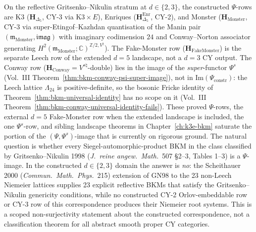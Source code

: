 On the reflective Gritsenko--Nikulin stratum at \(d\in\{2,3\}\), the
constructed \(\Psi\)-rows are K3
($\mathbf{H}_{\Delta_5}$, CY-3 via $\mathrm{K3} \times E$), Enriques
($\mathbf{H}_{\Delta_5}^{\mathrm{Enr}}$, CY-2), and Monster
($\mathbf{H}_{\mathrm{Monster}}$, CY-3 via super-Etingof--Kazhdan
quantisation of the Manin pair
$(\mathfrak m_{\mathrm{Monster}}, \mathfrak{imag})$ with imaginary
codimension $24$ and Conway--Norton associator generating
$H^2(\mathfrak m_{\mathrm{Monster}}; \mathbb C)^{\mathbb Z/2, V^\natural}$).
The Fake-Monster row
($\mathbf{H}_{\mathrm{FakeMonster}}$) is the separate Leech row of the
extended \(d=5\) landscape, not a \(d=3\) CY output. The Conway
row ($\mathbf{H}_{\mathrm{Conway}} = V^{s\natural}$-double) lies in
the image of the \emph{super}-functor $\Psi^{s}$
(Vol.~III Theorem~\ref{thm:bkm-conway-psi-super-image}), not in
$\mathrm{Im}(\Psi_{\mathrm{constr}})$: the Leech lattice $\Lambda_{24}$ is
positive-definite, so the bosonic Fricke identity of
Theorem~\ref{thm:bkm-universal-identity} has no scope on it
(Vol.~III Theorem~\ref{thm:bkm-conway-universal-identity-fails}).
These proved $\Psi$-rows, the external \(d=5\) Fake-Monster row when the
extended landscape is included, the one $\Psi^{s}$-row, and sibling
landscape theorems in Chapter~\ref{ch:k3e-bkm} saturate the portion
of the $(\Psi,\Psi^{s})$-image that is currently on rigorous ground. The natural question is whether every Siegel-automorphic-product BKM in the class classified by Gritsenko--Nikulin 1998 (\emph{J.\ reine angew.\ Math.}~507 \S2--3, Tables 1--3) is a $\Psi$-image. In the constructed \(d\in\{2,3\}\) domain the answer is \emph{no}: the Scheithauer 2000 (\emph{Commun.\ Math.\ Phys.}~215) extension of GN98 to the 23 non-Leech Niemeier lattices supplies 23 explicit reflective BKMs that satisfy the Gritsenko--Nikulin genericity conditions, while no constructed CY-2 Orlov-embeddable row or CY-3 row of this correspondence produces their Niemeier root systems. This is a scoped non-surjectivity statement about the constructed correspondence, not a classification theorem for all abstract smooth proper CY categories.

